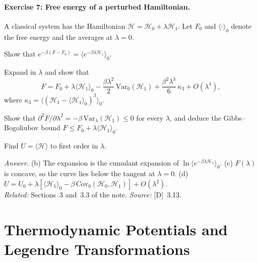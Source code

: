 \documentclass[11pt]{article}      %
\numberwithin{equation}{section}   %
\begin{document}
\paragraph{Exercise 7: Free energy of a perturbed Hamiltonian.}
A classical system has the Hamiltonian $\mathcal{H} = \mathcal{H}_0 + \lambda\mathcal{H}_1$. Let $F_0$ and $\langle\cdot\rangle_0$ denote the free energy and the averages at $\lambda = 0$.
\begin{parts}
    \item Show that $e^{-\beta(F - F_0)} = \langle e^{-\beta\lambda\mathcal{H}_1}\rangle_0$.
    \item Expand in $\lambda$ and show that
    \begin{equation*}
        F = F_0 + \lambda\langle\mathcal{H}_1\rangle_0 - \frac{\beta\lambda^2}{2}\,\mathrm{Var}_0(\mathcal{H}_1) + \frac{\beta^2\lambda^3}{6}\,\kappa_3 + O(\lambda^4),
    \end{equation*}
    where $\kappa_3 = \langle(\mathcal{H}_1 - \langle\mathcal{H}_1\rangle_0)^3\rangle_0$.
    \item Show that $\partial^2F/\partial\lambda^2 = -\beta\,\mathrm{Var}_\lambda(\mathcal{H}_1) \le 0$ for every $\lambda$, and deduce the Gibbs--Bogoliubov bound $F \le F_0 + \lambda\langle\mathcal{H}_1\rangle_0$.
    \item Find $U = \langle\mathcal{H}\rangle$ to first order in $\lambda$.
\end{parts}
\textit{Answer.} (b) The expansion is the cumulant expansion of $\ln\langle e^{-\beta\lambda\mathcal{H}_1}\rangle_0$. (c) $F(\lambda)$ is concave, so the curve lies below the tangent at $\lambda = 0$. (d) $U = U_0 + \lambda\left[\langle\mathcal{H}_1\rangle_0 - \beta\,\mathrm{Cov}_0(\mathcal{H}_0, \mathcal{H}_1)\right] + O(\lambda^2)$.\\
\textit{Related:} Sections~3 and~3.3 of the note. \textit{Source:} [D]~3.13.

\section{Thermodynamic Potentials and Legendre Transformations}
\end{document}
